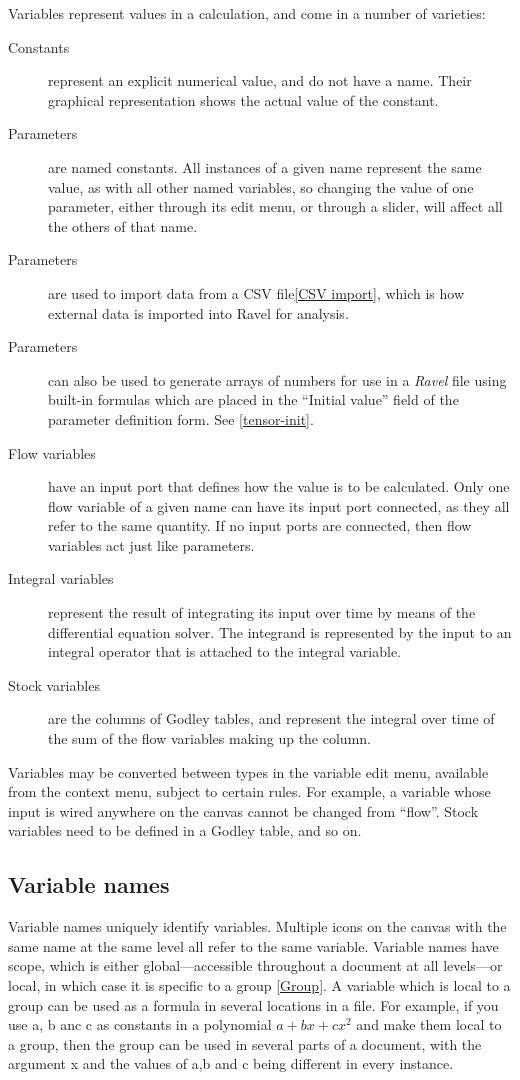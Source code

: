 Variables represent values in a calculation, and come in a number
of varieties: 
\begin{description}
\item [{Constants}] represent an explicit numerical value, and do not have
a name. Their graphical representation shows the actual value of the
constant. 
\item [{Parameters}] are named constants. All instances of a given name
represent the same value, as with all other named variables, so changing
the value of one parameter, either through its edit menu, or through
a slider, will affect all the others of that name.
\item [{Parameters}] are used to import data from a CSV file\ref{CSV import},
which is how external data is imported into Ravel for analysis.
\item [{Parameters}] can also be used to generate arrays of numbers for
use in a \emph{Ravel} file using built-in formulas which are placed
in the ``Initial value'' field of the parameter definition form.
See \ref{tensor-init}.
\item [{Flow variables}] have an input port that defines how the value
is to be calculated. Only one flow variable of a given name can have
its input port connected, as they all refer to the same quantity.
If no input ports are connected, then flow variables act just like
parameters. 
\item [{Integral variables}] represent the result of integrating its input
over time by means of the differential equation solver. The integrand
is represented by the input to an integral operator that is attached
to the integral variable. 
\item [{Stock variables}] are the columns of Godley tables, and represent
the integral over time of the sum of the flow variables making up
the column. 
\end{description}
Variables may be converted between types in the variable edit menu,
available from the context menu, subject to certain rules. For example,
a variable whose input is wired anywhere on the canvas cannot be changed
from ``flow''. Stock variables need to be defined in a Godley table,
and so on.

\subsection{Variable names}

Variable names uniquely identify variables. Multiple icons on the
canvas with the same name at the same level all refer to the same
variable. Variable names have scope, which is either global---accessible
throughout a document at all levels---or local, in which case it
is specific to a group \ref{Group}. A variable which is local to
a group can be used as a formula in several locations in a file. For
example, if you use a, b anc c as constants in a polynomial $a+bx+cx^{2}$
and make them local to a group, then the group can be used in several
parts of a document, with the argument x and the values of a,b and
c being different in every instance.

